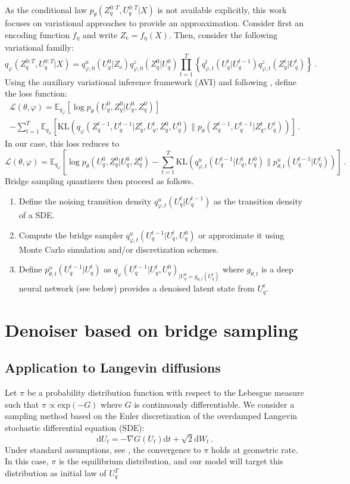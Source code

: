 \documentclass{article}
\newcommand{\rme}{\mathrm{e}}
\begin{document}
As the conditional law $p_{\theta}(Z_q^{0:T},U_q^{0:T}| X)$ is not available explicitly, this work focuses on  variational approaches to provide an approaximation. Consider first an encoding function $f_\eta$ and write $Z_\rme= f_\eta(X)$. Then, consider the following variational familly:
$$
q_{\varphi}(Z_q^{0:T},U_q^{0:T}| X) = q^u_{\varphi,0}(U_q^0 | Z_\rme)q_{\varphi,0}^z(Z_q^0|U_q^0) \prod_{t=1}^T\left\{ q^t_{\varphi,t}(U_q^t|U_q^{t-1})q^z_{\varphi,t}(Z_q^t|U_q^t)\right\}\,.
$$
Using the auxiliary variational inference framework (AVI) and following \cite{}, define the loss function:
\begin{multline*}
\mathcal{L}(\theta, \varphi) = \mathbb{E}_{q_\varphi} \left[ \log p_\theta(U_q^{0},Z_q^{0}|U_q^{0},Z_q^{0})\right]\\
 - \sum_{t=1}^{T}\mathbb{E}_{q_\varphi} \left[\mathrm{KL}(q_\varphi(Z_q^{t-1},U_q^{t-1}|Z_q^t,U_q^{t},Z_q^0,U_q^{0})\|p_\theta(Z_q^{t-1},U_q^{t-1}|Z_q^t,U_q^t)) \right]\,.
\end{multline*}
In our case, this loss reduces to
$$
\mathcal{L}(\theta, \varphi) = \mathbb{E}_{q_\varphi} \left[ \log p_\theta(U_q^{0},Z_q^{0}|U_q^{0},Z_q^{0}) - \sum_{t=1}^{T}\mathrm{KL}(q^u_{\varphi,t}(U_q^{t-1}|U_q^{t},U_q^{0})\|p^u_{\theta,t}(U_q^{t-1}|U_q^t)) \right]\,.
$$
Bridge sampling quantizers then proceed as follows.
\begin{enumerate}
\item Define the noising transition density $q^u_{\varphi,t}(U_q^{t}|U_q^{t-1})$ as the transition density of a SDE.
\item Compute the bridge sampler $q^u_{\varphi,t}(U_q^{t-1}|U_q^{t},U_q^{0})$ or approximate it using Monte Carlo simulation and/or discretization schemes.
\item Define $p^u_{\theta,t}(U_q^{t-1}|U_q^t)$ as $q_\varphi(U_q^{t-1}|U_q^{t},U_q^{0})_{|U_q^{0} = g_{\theta,t}(U_q^t)}$ where $g_{\theta,t}$ is a deep neural network (see below) provides a denoised latent state from $U_q^t$.
\end{enumerate}
\section{Denoiser based on bridge sampling}

\subsection{Application to Langevin diffusions}
Let $\pi$ be a probability distribution function with respect to the Lebesgue measure such that $\pi \propto \mathrm{exp}(-G)$ where $G$ is continuously differentiable.
We consider a sampling method based on the Euler discretization of the overdamped Langevin
stochastic differential equation (SDE):
$$
\mathrm{d}U_t = -\nabla G(U_t)\mathrm{d}t + \sqrt{2}\mathrm{d}W_t\,.
$$
Under standard assumptions, see \cite{}, the convergence to $\pi$ holds at geometric rate. In this case, $\pi$ is the equilibrium distribution, and our model will target this distribution as initial law of $U_q^T$
\end{document}
